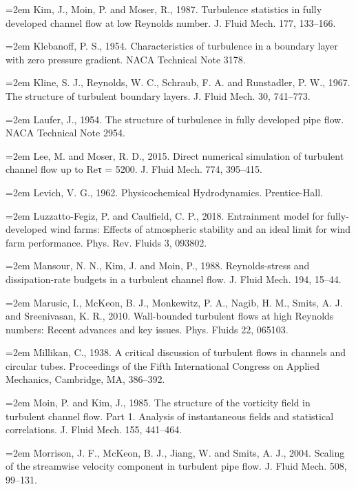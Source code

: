 \documentclass[12pt,a4paper,openany,fontset=none]{ctexbook}
\begin{document}
\par\hangindent=2em Kim, J., Moin, P. and Moser, R., 1987. Turbulence statistics in fully developed channel flow at low Reynolds number. J. Fluid Mech. 177, 133–166.
\par\hangindent=2em Klebanoff, P. S., 1954. Characteristics of turbulence in a boundary layer with zero pressure gradient. NACA Technical Note 3178.
\par\hangindent=2em Kline, S. J., Reynolds, W. C., Schraub, F. A. and Runstadler, P. W., 1967. The structure of turbulent boundary layers. J. Fluid Mech. 30, 741–773.
\par\hangindent=2em Laufer, J., 1954. The structure of turbulence in fully developed pipe flow. NACA Technical Note 2954.
\par\hangindent=2em Lee, M. and Moser, R. D., 2015. Direct numerical simulation of turbulent channel flow up to Reτ = 5200. J. Fluid Mech. 774, 395–415.
\par\hangindent=2em Levich, V. G., 1962. Physicochemical Hydrodynamics. Prentice-Hall.
\par\hangindent=2em Luzzatto-Fegiz, P. and Caulfield, C. P., 2018. Entrainment model for fully-developed wind farms: Effects of atmospheric stability and an ideal limit for wind farm performance. Phys. Rev. Fluids 3, 093802.
\par\hangindent=2em Mansour, N. N., Kim, J. and Moin, P., 1988. Reynolds-stress and dissipation-rate budgets in a turbulent channel flow. J. Fluid Mech. 194, 15–44.
\par\hangindent=2em Marusic, I., McKeon, B. J., Monkewitz, P. A., Nagib, H. M., Smits, A. J. and Sreenivasan, K. R., 2010. Wall-bounded turbulent flows at high Reynolds numbers: Recent advances and key issues. Phys. Fluids 22, 065103.
\par\hangindent=2em Millikan, C., 1938. A critical discussion of turbulent flows in channels and circular tubes. Proceedings of the Fifth International Congress on Applied Mechanics, Cambridge, MA, 386–392.
\par\hangindent=2em Moin, P. and Kim, J., 1985. The structure of the vorticity field in turbulent channel flow. Part 1. Analysis of instantaneous fields and statistical correlations. J. Fluid Mech. 155, 441–464.
\par\hangindent=2em Morrison, J. F., McKeon, B. J., Jiang, W. and Smits, A. J., 2004. Scaling of the streamwise velocity component in turbulent pipe flow. J. Fluid Mech. 508, 99–131.
\end{document}
